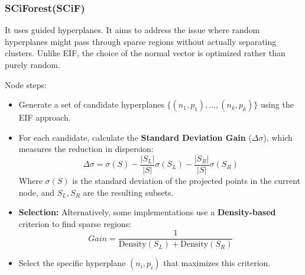 \subsubsection*{SCiForest(SCiF)}
It uses guided hyperplanes. It aims to address the issue where random hyperplanes might pass through sparse regions without actually separating clusters. Unlike EIF, the choice of the normal vector is optimized rather than purely random.

Node steps:
\begin{itemize}
    \item Generate a set of candidate hyperplanes $\{(n_1, p_1), \dots, (n_k, p_k)\}$ using the EIF approach.
    \item For each candidate, calculate the \textbf{Standard Deviation Gain} ($\Delta\sigma$), which measures the reduction in dispersion:
    $$\Delta\sigma = \sigma(S) - \frac{|S_L|}{|S|} \sigma(S_L) - \frac{|S_R|}{|S|} \sigma(S_R)$$
    Where $\sigma(S)$ is the standard deviation of the projected points in the current node, and $S_L, S_R$ are the resulting subsets.
    \item \textbf{Selection:} Alternatively, some implementations use a \textbf{Density-based} criterion to find sparse regions:
    $$Gain = \frac{1}{\text{Density}(S_L) + \text{Density}(S_R)}$$
    \item Select the specific hyperplane $(n_i,p_i)$ that maximizes this criterion.
\end{itemize}



